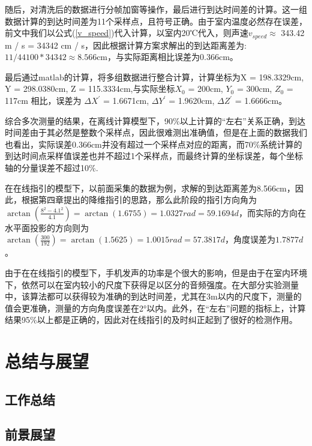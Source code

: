 \documentclass[winfonts]{njuthesis}
\begin{document}
		随后，对清洗后的数据进行分帧加窗等操作，最后进行到达时间差的计算。这一组数据计算的到达时间差为11个采样点，且符号正确。由于室内温度必然存在误差，前文中我们以公式(\ref{v_speed})代入计算，以室内20℃代入，则声速$v_{speed} \approx $ 343.42 m / s = 34342 cm / s，因此根据计算方案求解出的到达距离差为: $11 / 44100 * 34342 \approx 8.566$cm，与实际距离相比误差为0.366cm。
		
		最后通过matlab的计算，将多组数据进行整合计算，计算坐标为X = 198.3329cm, Y = 298.0380cm, Z = 115.3334cm,与实际坐标$X_0 $ = 200cm, $Y_0 $ = 300cm, $Z_0 $ = 117cm 相比，误差为 $\Delta X^{'}$ = 1.6671cm, $\Delta Y^{'}$ = 1.9620cm, $\Delta Z^{'}$ = 1.6666cm。
		
		综合多次测量的结果，在离线计算模型下，90\%以上计算的“左右”关系正确，到达时间差由于其必然是整数个采样点，因此很难测出准确值，但是在上面的数据我们也看出，实际误差0.366cm并没有超过一个采样点对应的距离，而70\%系统计算的到达时间点采样值误差也并不超过1个采样点，而最终计算的坐标误差，每个坐标轴的分量误差不超过10\%.
		
		
		在在线指引的模型下，以前面采集的数据为例，求解的到达距离差为8.566cm，因此，根据第四章提出的降维指引的思路，那么此阶段的指引方向角为$\arctan(\frac{8^2-4.1^2}{4.1}) = \arctan(1.6755) = 1.0327 rad = 59.1694 d$，而实际的方向在水平面投影的方向则为$\arctan(\frac{300}{192}) = \arctan(1.5625) = 1.0015 rad = 57.3817 d$，角度误差为$1.7877 d$。
		
		由于在在线指引的模型下，手机发声的功率是个很大的影响，但是由于在室内环境下，依然可以在室内较小的尺度下获得足以区分的音频强度。在大部分实验测量中，该算法都可以获得较为准确的到达时间差，尤其在3m以内的尺度下，测量的值会更准确，测量的方向角度误差在2°以内。此外，在“左右”问题的指标上，计算结果95\%以上都是正确的，因此对在线指引的及时纠正起到了很好的检测作用。	
		
		
\chapter{总结与展望}
	\section{工作总结}
	
	
	\section{前景展望}
	
\end{document}
